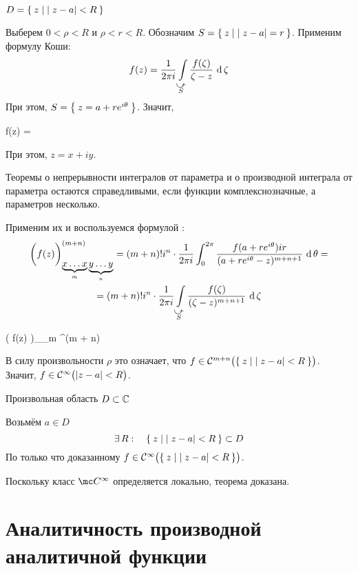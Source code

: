 \begin{eproof}
	\item $ D = \set{z \mid |z - a| < R} $

	Выберем $ 0 < \rho < R $ и $ \rho < r < R $. Обозначим $ S = \set{z \mid |z - a| = r} $. Применим формулу Коши:
	$$ f(z) = \frac1{2\pi i} \cint[\zeta]{\curvedir S}{\frac{f(\zeta)}{\zeta - z}} $$
	При этом, $ S = \set{z = a + re^{i\theta}} $. Значит,
	\begin{equ}{22}
		f(z) =  
	\end{equ}
	При этом, $ z = x + iy $.
	\begin{statement}
		Теоремы о непрерывности интегралов от параметра и о производной интеграла от параметра остаются справедливыми, если функции комплекснозначные, а параметров несколько.
	\end{statement}
	Применим их и воспользуемся формулой :
	\begin{multline}\lbl{23}
		\bigg( f(z) \bigg)_{\underbrace{x \dots x}_m \underbrace{y \dots y}_n}^{(m + n)} = (m + n)!i^n \cdot \frac1{2\pi i} \dint[\theta]0{2\pi}{\frac{f(a + re^{i\theta})ir}{(a + re^{i\theta} - z)^{m + n + 1}}} = \\
		= (m + n)!i^n \cdot \frac1{2\pi i} \cint[\zeta]{\curvedir S}{\frac{f(\zeta)}{(\zeta - z)^{m + n + 1}}}
	\end{multline}
	\begin{equ}{24}
		\implies \big( f(z) \big)_{_m }^{(m + n)} \in {}
	\end{equ}
	В силу произвольности $ \rho $ это означает, что $ f \in \Cont[m + n]{\set{z \mid |z - a| < R}} $. \\
	Значит, $ f \in \Cont[\infty]{|z - a| < R} $.
	\item Произвольная область $ D \sub \Co $

	Возьмём $ a \in D $
	$$ \exist R : \quad \set{z \mid |z - a| < R} \sub D $$
	По только что доказанному $ f \in \Cont[\infty]{\set{ z \mid |z - a| < R}} $.

	Поскольку класс $ \mc C^\infty $ определяется локально, теорема доказана.
\end{eproof}

\section{Аналитичность производной аналитичной функции}

